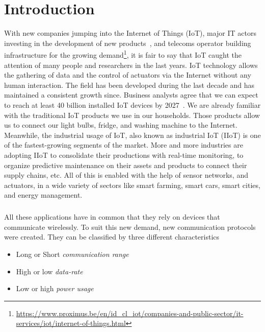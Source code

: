 \chapter{Introduction}

With new companies jumping into the Internet of Things (IoT),
major IT actors investing in the development of new
products~\cite{fortuneiot2019}, and telecoms operator building infrastructure
for the growing
demand\footnote{\url{https://www.proximus.be/en/id_cl_iot/companies-and-public-sector/it-services/iot/internet-of-things.html}},
it is fair to say that IoT caught the attention of many people and researchers
in the last years.
IoT technology allows the gathering of data and the control of actuators via
the Internet without any human interaction.
The field has been developed during the last decade and has maintained a
consistent growth since.
Business analysts agree that we can expect to reach at least 40 billion
installed IoT devices by 2027~\cite{businessinsider2020}.
We are already familiar with the traditional IoT products
we use in our households. Those products allow us to connect our light bulbs,
fridge, and washing machine to the Internet.
Meanwhile, the industrial usage of IoT, also known as industrial IoT (IIoT) is
one of the fastest-growing segments of the market.
More and more industries are adopting IIoT to consolidate their productions
with real-time monitoring, to organize predictive maintenance on their
assets and products to connect their supply chains, etc.
All of this is enabled with the help of sensor networks, and actuators, in a
wide variety of sectors like smart farming, smart cars,
smart cities, and energy management.

\paragraph{}

All these applications have in common that they rely on devices that
communicate wirelessly.
To suit this new demand, new communication protocols were created.
They can be classified by three different characteristics

\begin{itemize}
    \item Long or Short \emph{communication range}
    \item High or low \emph{data-rate}
    \item Low or high \emph{power usage}
\end{itemize}

